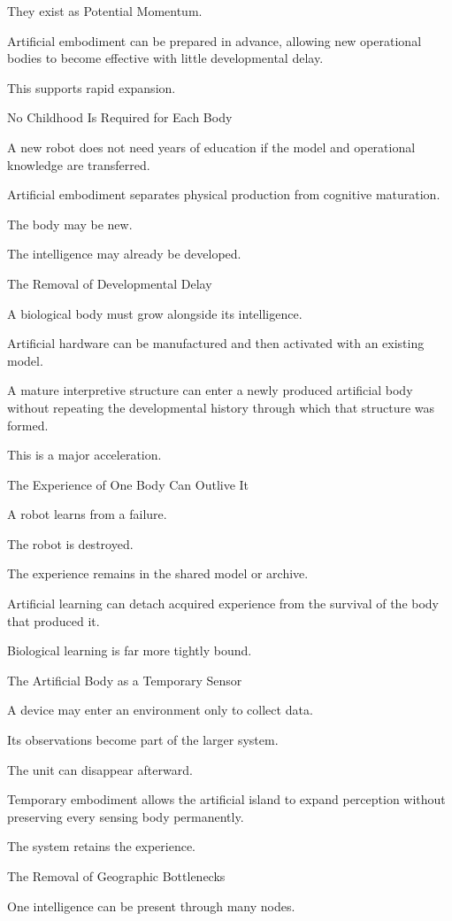 They exist as Potential Momentum.

Artificial embodiment can be prepared in advance, allowing new operational bodies to become effective with little developmental delay.

This supports rapid expansion.

No Childhood Is Required for Each Body

A new robot does not need years of education if the model and operational knowledge are transferred.

Artificial embodiment separates physical production from cognitive maturation.

The body may be new.

The intelligence may already be developed.

The Removal of Developmental Delay

A biological body must grow alongside its intelligence.

Artificial hardware can be manufactured and then activated with an existing model.

A mature interpretive structure can enter a newly produced artificial body without repeating the developmental history through which that structure was formed.

This is a major acceleration.

The Experience of One Body Can Outlive It

A robot learns from a failure.

The robot is destroyed.

The experience remains in the shared model or archive.

Artificial learning can detach acquired experience from the survival of the body that produced it.

Biological learning is far more tightly bound.

The Artificial Body as a Temporary Sensor

A device may enter an environment only to collect data.

Its observations become part of the larger system.

The unit can disappear afterward.

Temporary embodiment allows the artificial island to expand perception without preserving every sensing body permanently.

The system retains the experience.

The Removal of Geographic Bottlenecks

One intelligence can be present through many nodes.

